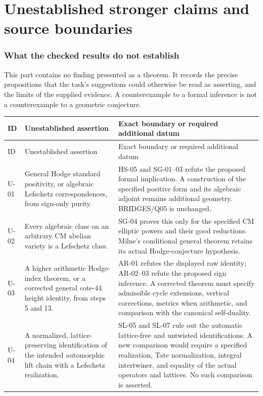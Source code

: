 \documentclass[11pt,a4paper]{article}
\theoremstyle{remark}
\begin{document}
\part{Unestablished stronger claims and source boundaries}
\section{What the checked results do not establish}

This part contains no finding presented as a theorem.  It records the
precise propositions that the task's suggestions could otherwise be read
as asserting, and the limits of the supplied evidence.  A counterexample
to a formal inference is not a counterexample to a geometric conjecture.

\begin{longtable}{@{}p{}p{}p{}@{}}
\toprule
ID & Unestablished assertion & Exact boundary or required additional datum\\
\midrule
\endfirsthead
\toprule ID & Unestablished assertion & Exact boundary or required additional datum\\
\midrule\endhead
U-01 & General Hodge standard positivity, or algebraic Lefschetz correspondences, from sign-only purity. & HS-05 and SG-01--03 refute the proposed formal implication. A construction of the specified positive form and its algebraic adjoint remains additional geometry. BRIDGES/Q05 is unchanged.\\
U-02 & Every algebraic class on an arbitrary CM abelian variety is a Lefschetz class. & SG-04 proves this only for the specified CM elliptic powers and their good reductions. Milne's conditional general theorem retains its actual Hodge-conjecture hypothesis.\\
U-03 & A higher arithmetic Hodge-index theorem, or a corrected general cote-44 height identity, from steps 5 and 13. & AR-01 refutes the displayed raw identity; AR-02--03 refute the proposed sign inference. A corrected theorem must specify admissible cycle extensions, vertical corrections, metrics when arithmetic, and comparison with the canonical self-duality.\\
U-04 & A normalized, lattice-preserving identification of the intended automorphic lift chain with a Lefschetz realization. & SL-05 and SL-07 rule out the automatic lattice-free and untwisted identifications. A new comparison would require a specified realization, Tate normalization, integral intertwiner, and equality of the actual operators and lattices. No such comparison is asserted.\\

\end{longtable}
\end{document}
